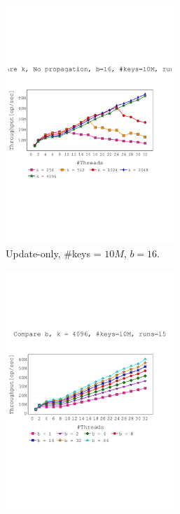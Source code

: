 \begin{figure}[htp!]
    \centering
    \begin{subfigure}{\textwidth}
    \centering
    \includegraphics[width=0.7\textwidth,trim={0cm 7cm 1cm 10cm},clip]{graphics/graphs/parameters/oracle_Quancurrent_blocking_numa_compare_k_b16_keys10M_Tup32_runs15_04-07-2022_12-26-29_flat.pdf}
    \caption{Update-only, \#keys = $10M$, $b=16$.}
    \label{fig: throughput_update_compare_k}
    \end{subfigure}
\vfill
    \begin{subfigure}{\textwidth}
    \centering
    \includegraphics[width=0.7\textwidth,trim={0cm 7cm 1cm 10cm},clip]{graphics/graphs/parameters/oracle_Quancurrent_blocking_numa_compare_b_k4096_keys10M_Tup32_runs15_11-08-2022_20-12-56_flat.pdf}

\end{subfigure}
\end{figure}
